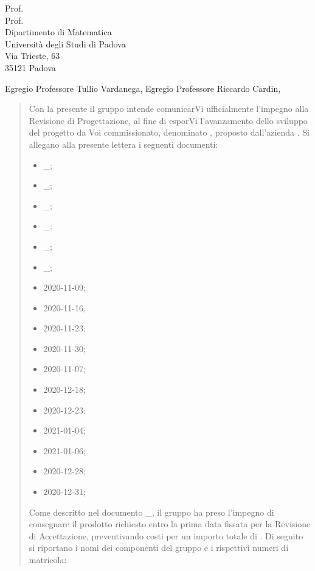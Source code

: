 \documentclass[a4paper,12pt]{letteracdp}
\date{11 gennaio 2021}
\begin{document}
\thispagestyle{empty}

\begin{letter}{
	Prof. \Tullio{} \\
	Prof. \Riccardo{} \\
	Dipartimento di Matematica \\
	Università degli Studi di Padova \\
	Via Trieste, 63 \\
	35121 Padova}
	
\opening{Egregio Professore Tullio Vardanega, \newline
Egregio Professore Riccardo Cardin,}

\begin{quotation}
	\noindent 
	Con la presente il gruppo \gruppo{} intende comunicarVi ufficialmente l'impegno alla Revisione di Progettazione, al fine di esporVi l'avanzamento dello sviluppo del progetto da Voi commissionato, denominato \progetto{}, proposto dall’azienda \proponente.\newline
	Si allegano alla presente lettera i seguenti documenti:
	\begin{itemize}
		\item \docSdF{}\_\versSdF;
		\item \docAdR{}\_\versAdR;
		\item \docG{}\_\versGlo;
		\item \docNdP{}\_\versNdP;
		\item \docPdP{}\_\versPdP;
		\item \docPdQ{}\_\versPdQ;
		\item \docVI{}2020-11-09;
		\item \docVI{}2020-11-16;
		\item \docVI{}2020-11-23;
		\item \docVI{}2020-11-30;
		\item \docVI{}2020-11-07;
		\item \docVI{}2020-12-18;
		\item \docVI{}2020-12-23;
		\item \docVI{}2021-01-04;
		\item \docVI{}2021-01-06;
		\item \docVE{}2020-12-28;
		\item \docVE{}2020-12-31;
\thispagestyle{empty}		
	\end{itemize}
Come descritto nel documento \docPdP{}\_\versPdP{}, il gruppo \gruppo{} ha preso l'impegno di consegnare il prodotto richiesto entro la prima data fissata per la Revisione di Accettazione, preventivando costi per un importo totale di \textbf{}. \newline
Di seguito si riportano i nomi dei componenti del gruppo e i rispettivi numeri di matricola:
	

\end{quotation}
\end{letter}
\end{document}
